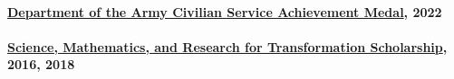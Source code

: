 \paragraph{\href{https://en.wikipedia.org/wiki/Department_of_the_Army_Civilian_Service_Achievement_Medal}{Department of the Army Civilian Service Achievement Medal}, 2022}
\paragraph{\href{https://www.smartscholarship.org/smart?id=about_smart}{Science, Mathematics, and Research for Transformation Scholarship}, 2016, 2018}
